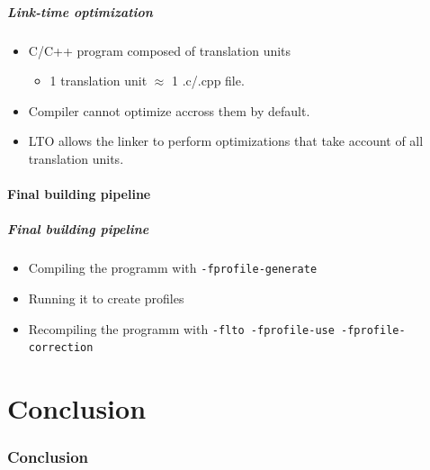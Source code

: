 \documentclass{beamer}
\begin{document}
    \begin{frame}
        \frametitle{Link-time optimization}

        \begin{itemize}
            \item C/C++ program composed of translation units
            \begin{itemize}
                \item 1 translation unit $ \approx $ 1 .c/.cpp file.
            \end{itemize}
            \item Compiler cannot optimize accross them by default.
            \item LTO allows the linker to perform optimizations that take account of all translation units.
        \end{itemize}
    \end{frame}

    \subsection{Final building pipeline}

    \begin{frame}[fragile]
        \frametitle{Final building pipeline}

        \begin{itemize}
            \item Compiling the programm with \verb'-fprofile-generate'
            \item Running it to create profiles
            \item Recompiling the programm with \verb'-flto -fprofile-use -fprofile-correction'
        \end{itemize}
    \end{frame}

\part{Conclusion}
\section*{Conclusion}
\end{document}
